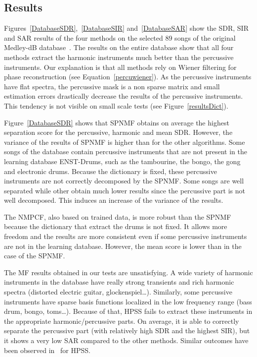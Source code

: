 \subsection{Results} 
\label{subResults}

Figures~\ref{DatabaseSDR},~\ref{DatabaseSIR} and~\ref{DatabaseSAR} show the SDR, SIR and SAR results of the four methods on the selected $89$ songs of the original Medley-dB database~\cite{bittner2014medleydb}. The results on the entire database show that all four methods extract the harmonic instruments much better than the percussive instruments. Our explanation is that all methods rely on Wiener filtering for phase reconstruction (see Equation~\eqref{percuwiener}). As the percussive instruments have flat spectra, the percussive mask is a non sparse matrix and small estimation errors drastically decrease the results of the percussive instruments. This tendency is not visible on small scale tests (see Figure~\ref{resultsDict}). 

Figure~\ref{DatabaseSDR} shows that SPNMF obtains on average the highest separation score for the percussive, harmonic and mean SDR. However, the variance of the results of SPNMF is higher than for the other algorithms. Some songs of the database contain percussive instruments that are not present in the learning database ENST-Drums, such as the tambourine, the bongo, the gong and electronic drums. Because the dictionary is fixed, these percussive instruments are not correctly decomposed by the SPNMF. Some songs are well separated while other obtain much lower results since the percussive part is not well decomposed. This induces an increase of the variance of the results. 

The NMPCF, also based on trained data, is more robust than the SPNMF because the dictionary that extract the drums is not fixed. It allows more freedom and the results are more consistent even if some percussive instruments are not in the learning database. However, the mean score is lower than in the case of the SPNMF.

The MF results obtained in our tests are unsatisfying. A wide variety of harmonic instruments in the database have really strong transients and rich harmonic spectra (distorted electric guitar, glockenspiel\ldots). Similarly, some percussive instruments have sparse basis functions localized in the low frequency range (bass drum, bongo, toms\ldots). Because of that, HPSS fails to extract these instruments in the appropriate harmonic/percussive parts. On average, it is able to correctly separate the percussive part (with relatively high SDR and the highest SIR), but it shows a very low SAR compared to the other methods. Similar outcomes have been observed in~\cite{canadas2014percussive} for HPSS.

